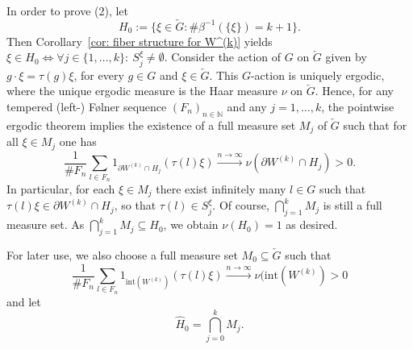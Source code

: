 \documentclass[titlepage,reqno,10pt]{amsart}
\theoremstyle{definition}
\def\N{{\mathbb N}}
\newcommand{\tm}{\subseteq}
\begin{document}
In order to prove (2), let 
$$H_0 := \{\xi\in\overleftarrow{G}: \#\beta^{-1}(\{\xi\}) = k+1\}.
$$
Then Corollary~\ref{cor: fiber structure for W^(k)} yields $\xi \in H_0 \iff \forall j\in \{1,\ldots,k\}:\: S_j^\xi \neq \emptyset$.
Consider the action of $G$ on $\overleftarrow{G}$ given by $g\cdot \xi= \tau(g)\xi$, for every $g\in G$ and $\xi\in \overleftarrow{G}$.
This $G$-action is uniquely ergodic, where the unique ergodic measure  is the Haar measure $\nu$ on $\overleftarrow{G}$.
Hence, for any tempered (left-) F\o lner sequence $(F_n)_{n\in\N}$ and any $j=1,\ldots , k$, the pointwise ergodic theorem \cite{Lin01} implies  the existence of a full measure set $M_j$ of $\overleftarrow{G}$ such that for all $\xi \in M_j$ one has
\begin{equation} \label{eq: H_0 definition} \frac{1}{\#F_n} \sum_{l\in F_n} 1_{\partial W^{(k)} \cap H_j} (\tau(l)\xi ) \xrightarrow{n\to\infty} \nu(\partial W^{(k)} \cap H_j) > 0.
\end{equation}
In particular, for each $\xi \in M_j$ there exist infinitely many $l \in G$ such that $\tau(l) \xi  \in \partial W^{(k)} \cap H_j$, so that $\tau(l) \in S_j^\xi$. 
Of course, $\bigcap_{j=1}^k M_j$ is still a full measure set. 
As $\bigcap_{j=1}^k M_j \tm H_0$, we obtain $\nu(H_0)=1$ as desired. 

For later use, we also choose a full measure set $M_0\subseteq\overleftarrow{G}$ such that 
\begin{equation} \label{eq: M_0 definition} \frac{1}{\#F_n} \sum_{l\in F_n} 1_{\mathrm{int}(W^{(k)})} (\tau(l)\xi ) \xrightarrow{n\to\infty} \nu(\mathrm{int}(W^{(k)})    > 0
\end{equation}
and let 
\begin{equation} \label{eq: def hat H_0}
\widehat{H}_0 = \bigcap_{j=0}^k M_j.
\end{equation}\medskip
\end{document}

